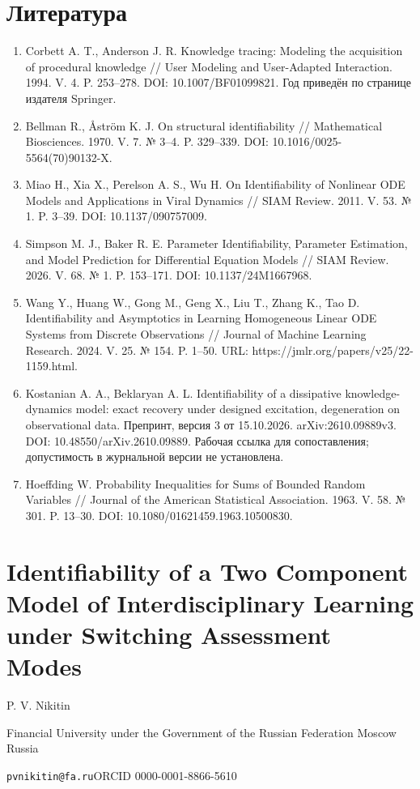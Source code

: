 \documentclass[11pt,a4paper]{article}
\begin{document}
\section*{Литература}\begin{enumerate}

\item Corbett A. T., Anderson J. R. Knowledge tracing: Modeling the acquisition of procedural knowledge // User Modeling and User-Adapted Interaction. 1994. V. 4. P. 253–278. DOI: 10.1007/BF01099821. Год приведён по странице издателя Springer.

\item Bellman R., Åström K. J. On structural identifiability // Mathematical Biosciences. 1970. V. 7. № 3–4. P. 329–339. DOI: 10.1016/0025-5564(70)90132-X.

\item Miao H., Xia X., Perelson A. S., Wu H. On Identifiability of Nonlinear ODE Models and Applications in Viral Dynamics // SIAM Review. 2011. V. 53. № 1. P. 3–39. DOI: 10.1137/090757009.

\item Simpson M. J., Baker R. E. Parameter Identifiability, Parameter Estimation, and Model Prediction for Differential Equation Models // SIAM Review. 2026. V. 68. № 1. P. 153–171. DOI: 10.1137/24M1667968.

\item Wang Y., Huang W., Gong M., Geng X., Liu T., Zhang K., Tao D. Identifiability and Asymptotics in Learning Homogeneous Linear ODE Systems from Discrete Observations // Journal of Machine Learning Research. 2024. V. 25. № 154. P. 1–50. URL: https://jmlr.org/papers/v25/22-1159.html.

\item Kostanian A. A., Beklaryan A. L. Identifiability of a dissipative knowledge-dynamics model: exact recovery under designed excitation, degeneration on observational data. Препринт, версия 3 от 15.10.2026. arXiv:2610.09889v3. DOI: 10.48550/arXiv.2610.09889. Рабочая ссылка для сопоставления; допустимость в журнальной версии не установлена.

\item Hoeffding W. Probability Inequalities for Sums of Bounded Random Variables // Journal of the American Statistical Association. 1963. V. 58. № 301. P. 13–30. DOI: 10.1080/01621459.1963.10500830.

\end{enumerate}


\section*{Identifiability of a Two Component Model of Interdisciplinary Learning under Switching Assessment Modes}

P. V. Nikitin\par Financial University under the Government of the Russian Federation Moscow Russia\par

\texttt{pvnikitin@fa.ru}\quad ORCID 0000-0001-8866-5610
\end{document}
